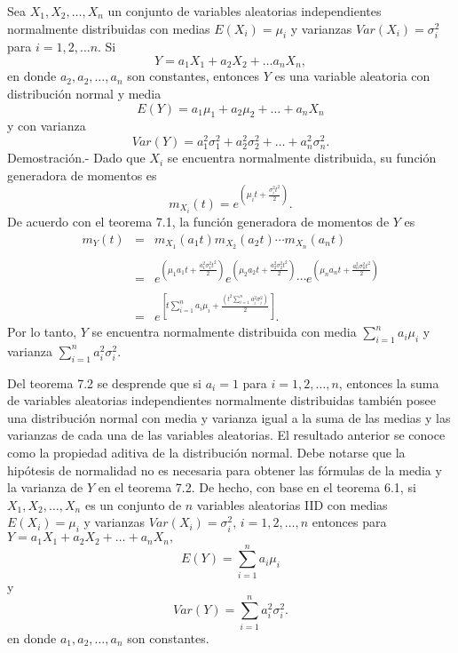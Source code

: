 \begin{teo}
    Sea $X_1,X_2,\ldots,X_n$ un conjunto de variables aleatorias independientes normalmente distribuidas con medias $E(X_i)=\mu_i$ y varianzas $Var(X_i)=\sigma^2_i$ para $i=1,2,\ldots n$. Si
    $$Y=a_1X_1+a_2X_2+\ldots a_nX_n,$$
    en donde $a_2,a_2,\ldots,a_n$ son constantes, entonces $Y$ es una variable aleatoria con distribución normal y media
    $$E(Y)=a_1\mu_1+a_2\mu_2+\ldots + a_nX_n$$
    y con varianza 
    $$Var(Y)=a_1^2\sigma_1^2+a_2^2\sigma_2^2 + \ldots + a_n^2\sigma_n^2.$$
	Demostración.-\; Dado que $X_i$ se encuentra normalmente distribuida, su función generadora de momentos es
	$$m_{X_i}(t)=e^{\left(\mu_i t + \frac{\sigma_i^2t^2}{2}\right)}.$$
	De acuerdo con el teorema 7.1, la función generadora de momentos de $Y$ es
	$$\begin{array}{rcl}
	    m_Y(t)&=&m_{X_1}(a_1t)m_{X_2}(a_2t)\cdots m_{X_n}(a_nt)\\\\
		  &=&e^{\left(\mu_1 a_1t + \frac{a_1^2\sigma_1^2t^2}{2}\right)}e^{\left(\mu_2a_2t + \frac{a_2^2\sigma_2^2t^2}{2}\right)}\cdots e^{\left(\mu_n a_nt + \frac{a_n^2\sigma_n^2t^2}{2}\right)}\\\\
		  &=&e^{\left[t\sum\limits_{i=1}^n a_i\mu_i+\frac{\left(t^2\sum\limits_{i=1}^n a_i^2\sigma_i^2\right)}{2}\right]}.
      \end{array}$$
      Por lo tanto, $Y$ se encuentra normalmente distribuida con media $\sum_{i=1}^na_i\mu_i$ y varianza $\sum_{i=1}^n a_i^2 \sigma_i^2.$
\end{teo}

Del teorema 7.2 se desprende que si $a_i=1$ para $i=1,2,\ldots,n$, entonces la suma de variables aleatorias independientes normalmente distribuidas también posee una distribución normal con media y varianza igual a la suma de las medias y las varianzas de cada una de las variables aleatorias. El resultado anterior se conoce como la propiedad aditiva de la distribución normal. Debe notarse que la hipótesis de normalidad no es necesaria para obtener las fórmulas de la media y la varianza de $Y$ en el teorema 7.2. De hecho, con base en el teorema 6.1, si $X_1,X_2,\ldots , X_n$ es un conjunto de $n$ variables aleatorias IID con medias $E(X_i)=\mu_i$ y varianzas $Var(X_i)=\sigma_i^2$, $i=1,2,\ldots , n$ entonces para $Y=a_1X_1+a_2X_2+\ldots +a_nX_n,$
$$E(Y)=\sum_{i=1}^{n}a_i\mu_i$$
y
$$Var(Y)=\sum_{i=1}^n a_i^2 \sigma_i^2.$$
en donde $a_1,a_2,\ldots,a_n$ son constantes.



